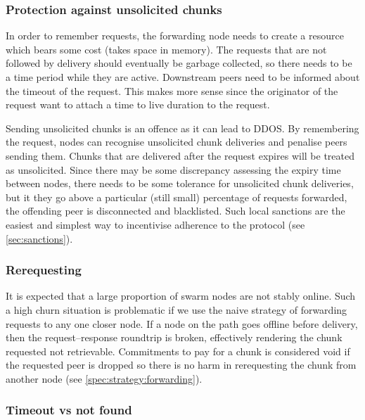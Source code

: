 \subsubsection{Protection against unsolicited chunks}

In order to remember requests, the forwarding node needs to create a resource which bears some cost (takes space in memory). The requests that are not followed by delivery should eventually be garbage collected, so there needs to be a time period while they are active. Downstream peers need to be informed about the timeout of the request. This makes more sense since the originator of the request want to attach a time to live duration to the request.  

Sending unsolicited chunks is an offence as it can lead to DDOS. By remembering the request, nodes can recognise unsolicited chunk deliveries and penalise peers sending them. Chunks that are delivered after the request expires will be treated as unsolicited. Since there may be some discrepancy assessing the expiry time between nodes, there needs to be some tolerance for  unsolicited chunk deliveries,  but it they go above a particular (still small) percentage of requests forwarded, the offending peer is disconnected and blacklisted. Such local sanctions are the easiest and simplest way to incentivise adherence to the protocol (see \ref{sec:sanctions}). 

\subsubsection{Rerequesting}

It is expected that a large proportion of swarm nodes are not stably online. Such a high churn situation is problematic if we use the naive strategy of forwarding requests to any one closer node. If a node on the path goes offline before delivery, then the request--response roundtrip is broken, effectively rendering the chunk requested not retrievable. Commitments to pay for a chunk is considered void if the requested peer is dropped so there is no harm in rerequesting the chunk from another node (see \ref{spec:strategy:forwarding}).


\subsubsection{Timeout vs not found}


